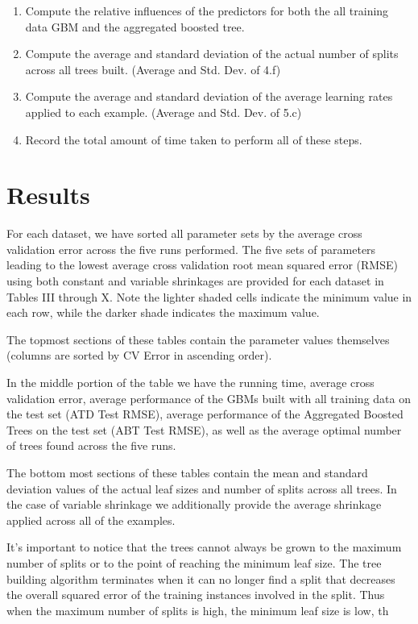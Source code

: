 \documentclass[9pt, conference]{IEEEtran}
\begin{document}
\begin{enumerate}
	\item Compute the relative influences of the predictors for both the all training data GBM and the aggregated boosted tree.
	\item Compute the average and standard deviation of the actual number of splits across all trees built. (Average and Std. Dev. of 4.f)
	\item Compute the average and standard deviation of the average learning rates applied to each example. (Average and Std. Dev. of 5.c)
	\item Record the total amount of time taken to perform all of these steps.
\end{enumerate}

\section{Results}

For each dataset, we have sorted all parameter sets by the average cross validation error across the five runs performed. The five sets of parameters leading to the lowest average cross validation root mean squared error (RMSE) using both constant and variable shrinkages are provided for each dataset in Tables III through X. Note the lighter shaded cells indicate the minimum value in each row, while the darker shade indicates the maximum value.

The topmost sections of these tables contain the parameter values themselves (columns are sorted by CV Error in ascending order). 

In the middle portion of the table we have the running time, average cross validation error, average performance of the GBMs built with all training data on the test set (ATD Test RMSE), average performance of the Aggregated Boosted Trees on the test set (ABT Test RMSE), as well as the average optimal number of trees found across the five runs. 

The bottom most sections of these tables contain the mean and standard deviation values of the actual leaf sizes and number of splits across all trees. In the case of variable shrinkage we additionally provide the average shrinkage applied across all of the examples. 

It's important to notice that the trees cannot always be grown to the maximum number of splits or to the point of reaching the minimum leaf size. The tree building algorithm terminates when it can no longer find a split that decreases the overall squared error of the training instances involved in the split. Thus when the maximum number of splits is high, the minimum leaf size is low, th
\end{document}
